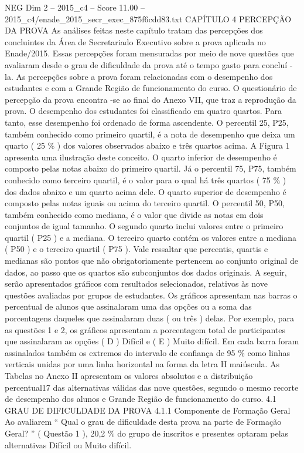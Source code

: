 \begin{textsample}{NEG Dim 2 – 2015\_c4 – Score 11.00 – 2015\_c4/enade\_2015\_secr\_exec\_875f6cdd83.txt}  \label{ex:f2_neg_350}
CAPÍTULO 4 PERCEPÇÃO DA PROVA As análises feitas neste capítulo tratam das percepções dos concluintes da Área de Secretariado Executivo sobre a prova aplicada no Enade/2015.
Essas percepções foram mensuradas por meio de nove questões que avaliaram desde o grau de dificuldade da prova até o tempo gasto para concluí -la.
As percepções sobre a prova foram relacionadas com o desempenho dos estudantes e com a Grande Região de funcionamento do curso.
O questionário de percepção da prova encontra -se ao final do Anexo VII, que traz a reprodução da prova.
O desempenho dos estudantes foi classificado em quatro quartos.
Para tanto, esse desempenho foi ordenado de forma ascendente.
O percentil 25, P25, também conhecido como primeiro quartil, é a nota de desempenho que deixa um quarto ( 25 \% ) dos valores observados abaixo e três quartos acima.
A Figura 1 apresenta uma ilustração deste conceito.
O quarto inferior de desempenho é composto pelas notas abaixo do primeiro quartil.
Já o percentil 75, P75, também conhecido como terceiro quartil, é o valor para o qual há três quartos ( 75 \% ) dos dados abaixo e um quarto acima dele.
O quarto superior de desempenho é composto pelas notas iguais ou acima do terceiro quartil.
O percentil 50, P50, também conhecido como mediana, é o valor que divide as notas em dois conjuntos de igual tamanho.
O segundo quarto inclui valores entre o primeiro quartil ( P25 ) e a mediana.
O terceiro quarto contém os valores entre a mediana ( P50 ) e o terceiro quartil ( P75 ).
Vale ressaltar que percentis, quartis e medianas são pontos que não obrigatoriamente pertencem ao conjunto original de dados, ao passo que os quartos são subconjuntos dos dados originais.
A seguir, serão apresentados gráficos com resultados selecionados, relativos às nove questões avaliadas por grupos de estudantes.
Os gráficos apresentam nas barras o percentual de alunos que assinalaram uma das opções ou a soma das porcentagens daqueles que assinalaram duas ( ou três ) delas.
Por exemplo, para as questões 1 e 2, os gráficos apresentam a porcentagem total de participantes que assinalaram as opções ( D ) Difícil e ( E ) Muito difícil.
Em cada barra foram assinalados também os extremos do intervalo de confiança de 95 \% como linhas verticais unidas por uma linha horizontal na forma da letra H maiúscula.
As Tabelas no Anexo II apresentam os valores absolutos e a distribuição percentual17 das alternativas válidas das nove questões, segundo o mesmo recorte de desempenho dos alunos e Grande Região de funcionamento do curso. 4.1 GRAU DE DIFICULDADE DA PROVA 4.1.1 Componente de Formação Geral Ao avaliarem “ Qual o grau de dificuldade desta prova na parte de Formação Geral? ” ( Questão 1 ), 20,2 \% do grupo de inscritos e presentes optaram pelas alternativas Difícil ou Muito difícil.

\end{textsample}
